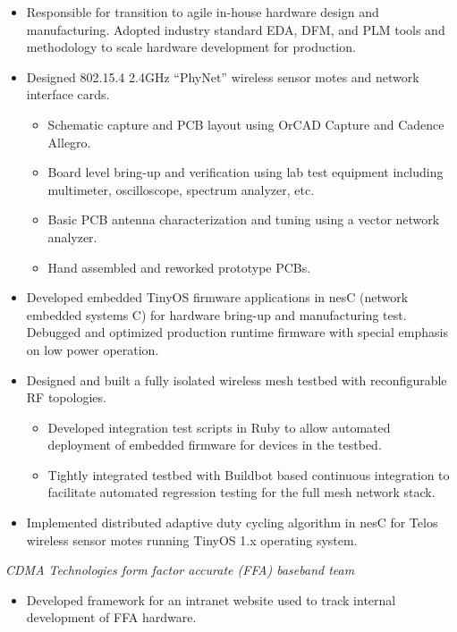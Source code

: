 \documentclass[11pt,a4paper]{moderncv}
\begin{document}
{
  \begin{itemize}
    \item Responsible for transition to agile in-house hardware design and manufacturing.  Adopted industry standard EDA, DFM, and PLM tools and methodology to scale hardware development for production.
    \item Designed 802.15.4 2.4GHz “PhyNet” wireless sensor motes and network interface cards.
      \begin{itemize}
        \item Schematic capture and PCB layout using OrCAD Capture and Cadence Allegro.
        \item Board level bring-up and verification using lab test equipment including multimeter, oscilloscope, spectrum analyzer, etc.
        \item Basic PCB antenna characterization and tuning using a vector network analyzer.
        \item Hand assembled and reworked prototype PCBs.
      \end{itemize}
    \item Developed embedded TinyOS firmware applications in nesC (network embedded systems C) for hardware bring-up and manufacturing test.  Debugged and optimized production runtime firmware with special emphasis on low power operation.
    \item Designed and built a fully isolated wireless mesh testbed with reconfigurable RF topologies.
    \begin{itemize}
      \item Developed integration test scripts in Ruby to allow automated deployment of embedded firmware for devices in the testbed.
      \item Tightly integrated testbed with Buildbot based continuous integration to facilitate automated regression testing for the full mesh network stack.
    \end{itemize}
  \end{itemize}
}
{
  \begin{itemize}
    \item Implemented distributed adaptive duty cycling algorithm in nesC for Telos wireless sensor motes running TinyOS 1.x operating system.
  \end{itemize}
}
{
  \textit{CDMA Technologies form factor accurate (FFA) baseband team}
  \begin{itemize}
    \item Developed framework for an intranet website used to track internal development of FFA hardware.
  \end{itemize}
}
\end{document}
